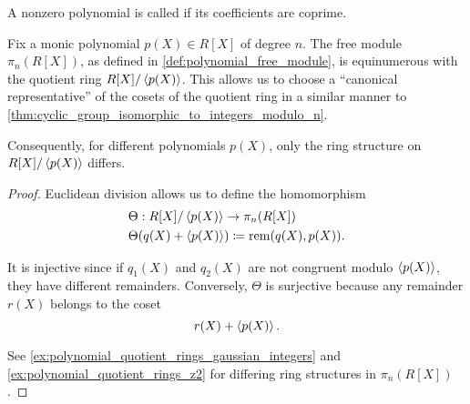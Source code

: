 \begin{definition}\label{def:primitive_polynomial}\cite[394]{Knapp2016BAlg}
  A nonzero polynomial is called  if its coefficients are coprime.
\end{definition}

\begin{proposition}\label{thm:polynomial_quotient_rings_equinumerous_with_module_of_polynomials}
  Fix a monic polynomial \( p(X) \in R[X] \) of degree \( n \). The free module \( \pi_n(R[X]) \), as defined in \cref{def:polynomial_free_module}, is equinumerous with the quotient ring \( R[X] / \left\langle p(X) \right\rangle \). This allows us to choose a \enquote{canonical representative} of the cosets of the quotient ring in a similar manner to \cref{thm:cyclic_group_isomorphic_to_integers_modulo_n}.

  Consequently, for different polynomials \( p(X) \), only the ring structure on \( R[X] / \left\langle p(X) \right\rangle \) differs.
\end{proposition}
\begin{proof}
  Euclidean division allows us to define the homomorphism
  \begin{align*}
    &\Theta: R[X] / \left\langle p(X) \right\rangle \to \pi_n(R[X]) \\
    &\Theta(q(X) + \left\langle p(X) \right\rangle) \coloneqq \operatorname{rem}(q(X), p(X)).
  \end{align*}

  It is injective since if \( q_1(X) \) and \( q_2(X) \) are not congruent modulo \( \left\langle p(X) \right\rangle \), they have different remainders. Conversely, \( \Theta \) is surjective because any remainder \( r(X) \) belongs to the coset
  \begin{equation*}
    r(X) + \left\langle p(X) \right\rangle.
  \end{equation*}

  See \cref{ex:polynomial_quotient_rings_gaussian_integers} and \cref{ex:polynomial_quotient_rings_z2} for differing ring structures in \( \pi_n(R[X]) \).
\end{proof}


